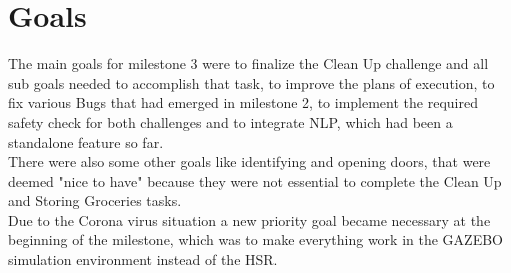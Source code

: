 \documentclass[main.tex]{subfiles}
\begin{document}
	
	\chapter{Goals}
The main goals for milestone 3 were to finalize the Clean Up challenge and all sub goals needed to accomplish that task, to improve the plans of execution, to fix various Bugs that had emerged in milestone 2, to implement the required safety check for both challenges and to integrate NLP, which had been a standalone feature so far.\\
There were also some other goals like identifying and opening doors, that were deemed "nice to have" because they were not essential to complete the Clean Up and Storing Groceries tasks.\\
Due to the Corona virus situation a new priority goal became necessary at the beginning of the milestone, which was to make everything work in the GAZEBO simulation environment instead of the HSR.
	
\end{document}

